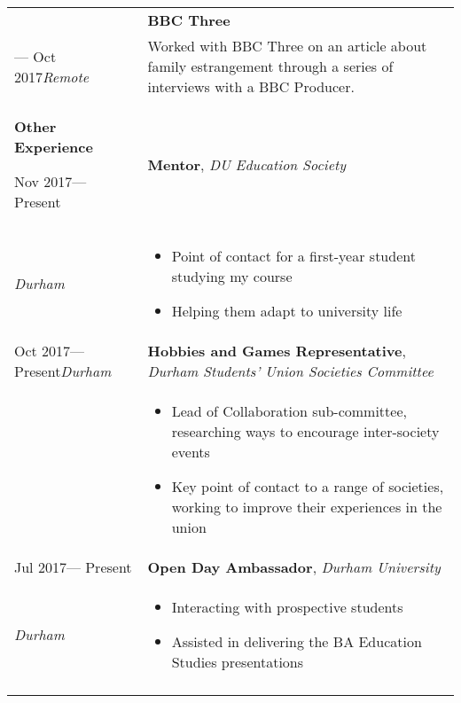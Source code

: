 \documentclass[12pt, a4paper]{article}
\newcommand{\smitem}[1]{\item {\small {#1}}}
\newenvironment{bullets}{\begin{minipage}[t]{\linewidth}\begin{itemize}[leftmargin=2em,label=-,nosep]}{\end{itemize}\end{minipage}\vspace{5pt}}
\newenvironment{sectionitem}{\vspace{6pt}\noindent\tabularx{\linewidth}{p{70pt}X}}{\endtabularx}
\newcommand{\sectionheader}[1]{
	\vspace{6pt}
	{
		\noindent
		\Large\textbf{#1}}}
\begin{document}
	\begin{table}
		\noindent
		\begin{tabularx}{\textwidth}{X|X}
		
			\begin{minipage}[t]{\linewidth}
				\begin{sectionitem}
					Jul 2017&\textbf{BBC Three}\\
					--- Oct 2017\newline\emph{Remote}&Worked with BBC Three on an article about family estrangement through a series of interviews with a BBC Producer.\\
				\end{sectionitem}
			
				\sectionheader{Other Experience}
				
				\begin{sectionitem}
					Nov 2017\newline--- Present&\textbf{Mentor}, \emph{DU Education Society}\\
					\emph{Durham}&\begin{bullets}
						\smitem{Point of contact for a first-year student studying my course}
						\smitem{Helping them adapt to university life}
					\end{bullets}\\
				\end{sectionitem}
			
				\begin{sectionitem}
					Oct 2017\newline --- Present\newline\emph{Durham}&\textbf{Hobbies and Games Representative}, \emph{Durham Students' Union Societies Committee}\\
					&\begin{bullets}
						\smitem{Lead of Collaboration sub-committee, researching ways to encourage inter-society events}
						\smitem{Key point of contact to a range of societies, working to improve their experiences in the union}
					\end{bullets}\\
				\end{sectionitem}
			
				\begin{sectionitem}
					Jul 2017\newline --- Present&\textbf{Open Day Ambassador}, \emph{Durham University}\\
					\emph{Durham}&\begin{bullets}
						\smitem{Interacting with prospective students}
						\smitem{Assisted in delivering the BA Education Studies presentations}
					\end{bullets}\\
				\end{sectionitem}
			

\end{minipage}
\end{tabularx}
\end{table}
\end{document}
